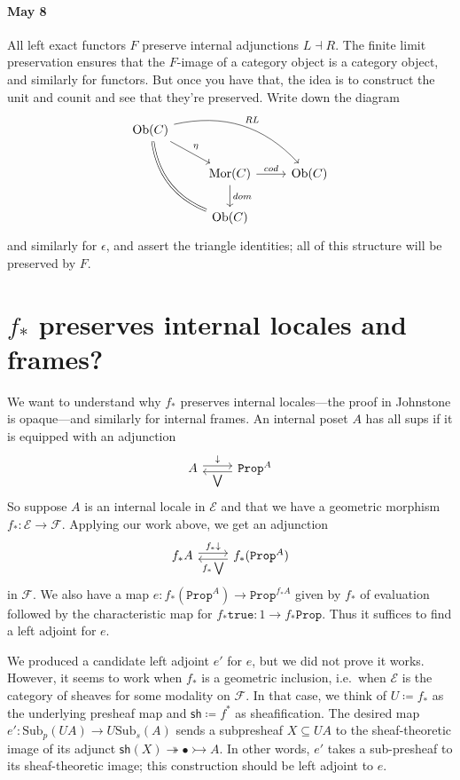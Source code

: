 \documentclass[11pt, oneside, article]{memoir}
\theoremstyle{plain}
\theoremstyle{definition}
\theoremstyle{remark}
\renewcommand{\ss}{\subseteq}
\DeclareMathOperator{\Mor}{Mor}
\DeclareMathOperator{\Ob}{Ob}
\newcommand{\const}[1]{\mathtt{#1}}
\newcommand{\Set}[1]{\mathrm{#1}}
\newcommand{\cat}[1]{\mathcal{#1}}
\newcommand{\Fun}[1]{\mathsf{#1}}
\newcommand{\surj}{\twoheadrightarrow}
\newcommand{\inj}{\rightarrowtail}
\newcommand{\Prop}{\const{Prop}}
\newcommand{\Sub}{\Set{Sub}}
\newcommand{\asSh}{\Fun{sh}}
\newcommand{\down}{\mathord{\downarrow}}
\newcommand{\true}{\const{true}}
\begin{document}
\paragraph{May 8}
All left exact functors $F$ preserve internal adjunctions $L\dashv R$. The finite limit preservation ensures that the $F$-image of a category object is a category object, and similarly for functors. But once you have that, the idea is to construct the unit and counit and see that they're preserved. Write down the diagram
\[
\begin{tikzcd}
	\Ob(C)\ar[drr, bend left, "RL"]\ar[ddr, bend right, equal]\ar[dr, "\eta"]\\
	&\Mor(C)\ar[r, "cod"]\ar[d, "dom"]&\Ob(C)\\
	&\Ob(C)
\end{tikzcd}
\]
and similarly for $\epsilon$, and assert the triangle identities; all of this structure will be preserved by $F$.

\section{$f_*$ preserves internal locales and frames?}\label{sec.preserve_loc_frame}
We want to understand why $f_*$ preserves internal locales---the proof in Johnstone is opaque---and similarly for internal frames. An internal poset $A$ has all sups if it is equipped with an adjunction
\[
\begin{tikzcd}
	A\ar[r, shift left, "\down"]&\Prop^A\ar[l, shift left, "\bigvee"]
\end{tikzcd}
\]
So suppose $A$ is an internal locale in $\cat{E}$ and that we have a geometric morphism $f_*\colon\cat{E}\to\cat{F}$. Applying our work above, we get an adjunction
\[
\begin{tikzcd}
	f_*A\ar[r, shift left, "f_*\down"]&f_*(\Prop^A)\ar[l, shift left, "f_*\bigvee"]
\end{tikzcd}
\]
in $\cat{F}$. We also have a map $e\colon f_*(\Prop^A)\to\Prop^{f_*A}$ given by $f_*$ of evaluation followed by the characteristic map for $f_*\true\colon 1\to f_*\Prop$. Thus it suffices to find a left adjoint for $e$.

We produced a candidate left adjoint $e'$ for $e$, but we did not prove it works. However, it seems to work when $f_*$ is a geometric inclusion, i.e.\ when $\cat{E}$ is the category of sheaves for some modality on $\cat{F}$. In that case, we think of $U\coloneqq f_*$ as the underlying presheaf map and $\asSh\coloneqq f^*$ as sheafification. The desired map $e'\colon\Sub_p(UA)\to U\Sub_s(A)$ sends a subpresheaf $X\ss UA$ to the sheaf-theoretic image of its adjunct $\asSh(X)\surj\bullet\inj A$. In other words, $e'$ takes a sub-presheaf to its sheaf-theoretic image; this construction should be left adjoint to $e$.
\end{document}
